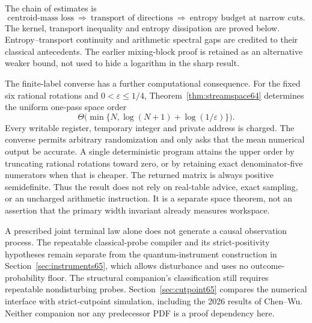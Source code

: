 The chain of estimates is
\[
 \text{centroid-mass loss}\ \Longrightarrow\
 \text{transport of directions}\ \Longrightarrow\
 \text{entropy budget at narrow cuts}.
\]
The kernel, transport inequality and entropy dissipation are proved
below. Entropy--transport continuity and arithmetic spectral gaps are
credited to their classical antecedents. The earlier mixing-block proof
is retained as an alternative weaker bound, not used to hide a
logarithm in the sharp result.

The finite-label converse has a further computational consequence.
For the fixed six rational rotations and $0<\varepsilon\le1/4$,
Theorem~\ref{thm:streamspace64}
determines the uniform one-pass space order
\[
 \Theta\bigl(\min\{N,\log(N+1)+\log(1/\varepsilon)\}\bigr).
\]
Every writable register, temporary integer and private address is charged.
The converse permits arbitrary randomization and only asks that the mean
numerical output be accurate. A single deterministic program attains
the upper order by truncating rational rotations toward zero, or by
retaining exact denominator-five numerators when that is cheaper.
The returned matrix is always positive semidefinite. Thus the result
does not rely on real-table advice, exact sampling, or an uncharged
arithmetic instruction. It is a separate space theorem, not an assertion
that the primary width invariant already measures workspace.

A prescribed joint terminal law alone does not generate a causal
observation process. The repeatable classical-probe compiler and its
strict-positivity hypotheses remain separate from the quantum-instrument
construction in Section~\ref{sec:instruments65}, which allows disturbance
and uses no outcome-probability floor. The structural companion's
classification still requires repeatable nondisturbing probes.
Section~\ref{sec:cutpoint65} compares the numerical interface with
strict-cutpoint simulation, including the 2026 results of Chen--Wu.
Neither companion nor any predecessor PDF is a proof dependency here.
